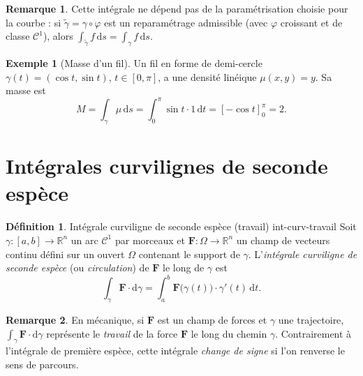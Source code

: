 \documentclass[12pt,a4paper,openany]{book}
\theoremstyle{definition}
\newtheorem{definition}{Définition}[chapter]
\newtheorem{remarque}{Remarque}[chapter]
\newtheorem{exemple}{Exemple}[chapter]
\newcommand{\R}{\mathbb{R}}
\newcommand{\dd}{\mathrm{d}}
\begin{document}
\begin{remarque}\label{rem:invariance-param}
  Cette intégrale ne dépend pas de la paramétrisation choisie pour la
  courbe : si $\tilde{\gamma} = \gamma\circ\varphi$ est un
  reparamétrage admissible (avec $\varphi$ croissant et de classe
  $\mathcal{C}^1$), alors
  $\int_{\tilde{\gamma}}f\,\dd s = \int_\gamma f\,\dd s$.
\end{remarque}

\begin{exemple}[Masse d'un fil]\label{ex:masse-fil}
  Un fil en forme de demi-cercle $\gamma(t) = (\cos t, \sin t)$,
  $t \in [0,\pi]$, a une densité linéique $\mu(x,y) = y$. Sa masse est
  \[
    M = \int_\gamma \mu\,\dd s
    = \int_0^\pi \sin t \cdot 1\,\dd t
    = [-\cos t]_0^\pi = 2.
  \]
\end{exemple}



\section{Intégrales curvilignes de seconde espèce}
\label{sec:int-curv-seconde-espece}


\begin{definition}{Intégrale curviligne de seconde espèce (travail)}%
  {int-curv-travail}
  Soit $\gamma\colon[a,b]\to\R^n$ un arc $\mathcal{C}^1$ par morceaux
  et $\mathbf{F}\colon\Omega \to \R^n$ un champ de vecteurs continu
  défini sur un ouvert $\Omega$ contenant le support de $\gamma$.
  L'\emph{intégrale curviligne de seconde espèce} (ou \emph{circulation})
  de $\mathbf{F}$ le long de $\gamma$ est
  \begin{equation}\label{eq:int-curv-travail}
    \int_\gamma \mathbf{F}\cdot\dd\gamma
    = \int_a^b \mathbf{F}\bigl(\gamma(t)\bigr)\cdot\gamma'(t)\,\dd t.
  \end{equation}
\end{definition}

\begin{remarque}\label{rem:travail-physique}
  En mécanique, si $\mathbf{F}$ est un champ de forces et $\gamma$ une
  trajectoire, $\int_\gamma\mathbf{F}\cdot\dd\gamma$ représente le
  \emph{travail} de la force $\mathbf{F}$ le long du
  chemin $\gamma$. Contrairement à l'intégrale de première espèce,
  cette intégrale \emph{change de signe} si l'on renverse le sens de
  parcours.
\end{remarque}
\end{document}
